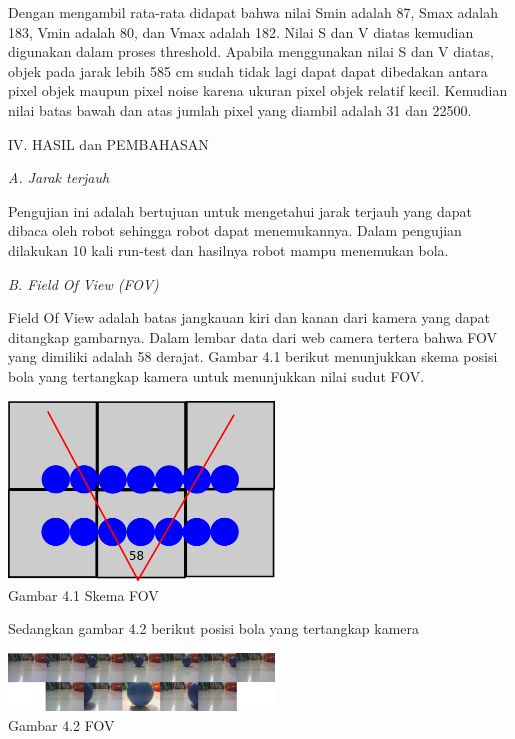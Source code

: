 \documentclass[10pt,journal,compsoc]{IEEEtran}
\begin{document}
  Dengan mengambil rata-rata didapat bahwa nilai Smin adalah 87, Smax adalah 183, Vmin adalah 80, dan Vmax adalah 182.
  Nilai S dan V diatas kemudian digunakan dalam proses threshold.
  Apabila menggunakan nilai S dan V diatas, objek pada jarak lebih 585 cm sudah tidak lagi dapat dapat dibedakan antara pixel objek maupun pixel noise karena ukuran pixel objek relatif kecil.
  Kemudian nilai batas bawah dan atas jumlah pixel yang diambil adalah 31 dan 22500.
  
  \begin{center}
     IV. HASIL dan PEMBAHASAN
  \end{center}
  
  \noindent \textit{A. Jarak terjauh}
  
  Pengujian ini adalah bertujuan untuk mengetahui jarak terjauh yang dapat dibaca oleh robot sehingga robot dapat menemukannya.
  Dalam pengujian dilakukan 10 kali run-test dan hasilnya robot mampu menemukan bola.
  
  \noindent \textit{B. Field Of View (FOV)}
  
  Field Of View adalah batas jangkauan kiri dan kanan dari kamera yang dapat ditangkap gambarnya.
  Dalam lembar data dari web camera tertera bahwa FOV yang dimiliki adalah 58 derajat.
  Gambar 4.1 berikut menunjukkan skema posisi bola yang tertangkap kamera untuk menunjukkan nilai sudut FOV.
  \begin{center}
    \includegraphics[width=200pt]{fov}\\
    Gambar 4.1 Skema FOV
  \end{center}
  Sedangkan gambar 4.2 berikut posisi bola yang tertangkap kamera
  \begin{center}
    \includegraphics[width=200pt]{data_fov}\\
    Gambar 4.2 FOV
  \end{center}
  
\end{document}
